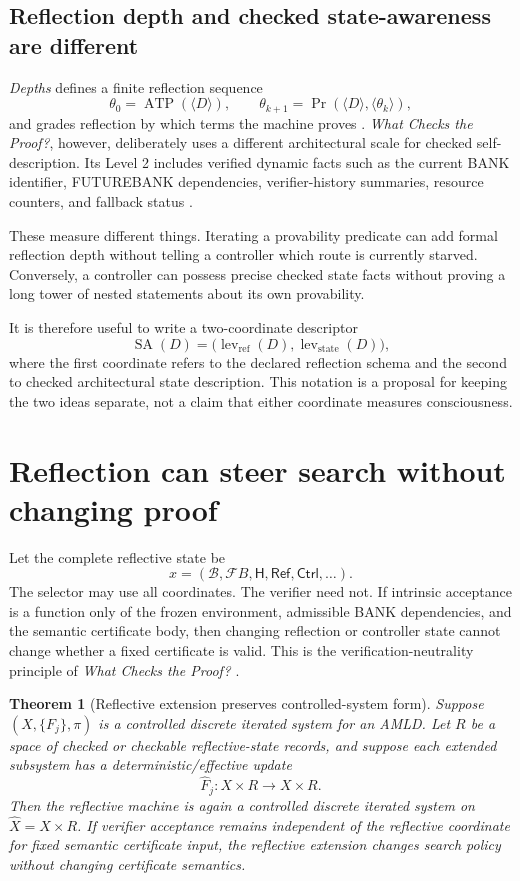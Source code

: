 \documentclass[11pt]{article}
\newtheorem{theorem}{Theorem}[section]
\theoremstyle{definition}
\theoremstyle{remark}
\newcommand{\Bank}{\mathcal B}
\newcommand{\Future}{\mathcal F\!B}
\newcommand{\lev}{\operatorname{lev}}
\newcommand{\Prv}{\operatorname{Pr}}
\newcommand{\ATP}{\operatorname{ATP}}
\begin{document}
\subsection{Reflection depth and checked state-awareness are different}
\emph{Depths} defines a finite reflection sequence
\[
\theta_0=\ATP(\langle D\rangle),
\qquad
\theta_{k+1}=\Prv(\langle D\rangle,\langle\theta_k\rangle),
\]
and grades reflection by which terms the machine proves \cite{Depths}. \emph{What Checks the Proof?}, however, deliberately uses a different architectural scale for checked self-description. Its Level 2 includes verified dynamic facts such as the current BANK identifier, FUTUREBANK dependencies, verifier-history summaries, resource counters, and fallback status \cite{WCTP}.

These measure different things. Iterating a provability predicate can add formal reflection depth without telling a controller which route is currently starved. Conversely, a controller can possess precise checked state facts without proving a long tower of nested statements about its own provability.

It is therefore useful to write a two-coordinate descriptor
\[
\operatorname{SA}(D)
=
\bigl(\lev_{\mathrm{ref}}(D),\lev_{\mathrm{state}}(D)\bigr),
\]
where the first coordinate refers to the declared reflection schema and the second to checked architectural state description. This notation is a proposal for keeping the two ideas separate, not a claim that either coordinate measures consciousness.

\section{Reflection can steer search without changing proof}

Let the complete reflective state be
\[
x=(\Bank,\Future,\mathsf H,\mathsf{Ref},\mathsf{Ctrl},\ldots).
\]
The selector may use all coordinates. The verifier need not. If intrinsic acceptance is a function only of the frozen environment, admissible BANK dependencies, and the semantic certificate body, then changing reflection or controller state cannot change whether a fixed certificate is valid. This is the verification-neutrality principle of \emph{What Checks the Proof?} \cite{WCTP}.

\begin{theorem}[Reflective extension preserves controlled-system form]\label{thm:reflectifs}
Suppose $(X,\{F_j\},\pi)$ is a controlled discrete iterated system for an AMLD. Let $R$ be a space of checked or checkable reflective-state records, and suppose each extended subsystem has a deterministic/effective update
\[
\widehat F_j:X\times R\to X\times R.
\]
Then the reflective machine is again a controlled discrete iterated system on $\widehat X=X\times R$. If verifier acceptance remains independent of the reflective coordinate for fixed semantic certificate input, the reflective extension changes search policy without changing certificate semantics.
\end{theorem}
\end{document}
